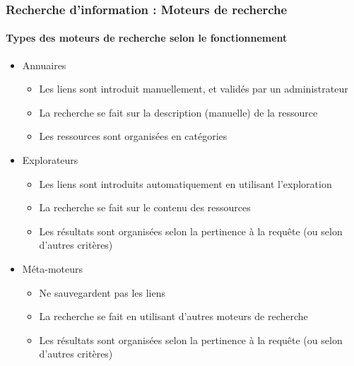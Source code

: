 \documentclass[xcolor=table]{beamer}
\begin{document}
\begin{frame}
\frametitle{Recherche d'information : Moteurs de recherche}
\framesubtitle{Types des moteurs de recherche selon le fonctionnement}


\begin{itemize}
	\item Annuaires
	\begin{itemize}
		\item Les liens sont introduit manuellement, et validés par un administrateur
		\item La recherche se fait sur la description (manuelle) de la ressource 
		\item Les ressources sont organisées en catégories 
	\end{itemize}
	
	\item Explorateurs
	\begin{itemize}
		\item Les liens sont introduits automatiquement en utilisant l'exploration 
		\item La recherche se fait sur le contenu des ressources
		\item Les résultats sont organisées selon la pertinence à la requête (ou selon d'autres critères)
	\end{itemize}

	\item Méta-moteurs
	\begin{itemize}
		\item Ne sauvegardent pas les liens 
		\item La recherche se fait en utilisant d'autres moteurs de recherche
		\item Les résultats sont organisées selon la pertinence à la requête (ou selon d'autres critères)
	\end{itemize}
\end{itemize} 

\end{frame}
\end{document}
